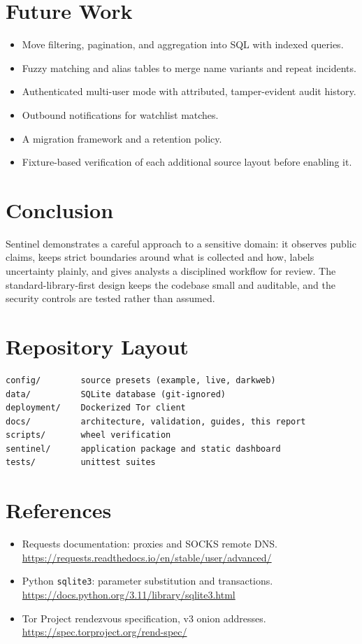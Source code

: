 \documentclass[11pt,a4paper]{article}
\newcommand{\code}[1]{\texttt{\small #1}}
\begin{document}
\section{Future Work}
\begin{itemize}
  \item Move filtering, pagination, and aggregation into SQL with indexed queries.
  \item Fuzzy matching and alias tables to merge name variants and repeat incidents.
  \item Authenticated multi-user mode with attributed, tamper-evident audit history.
  \item Outbound notifications for watchlist matches.
  \item A migration framework and a retention policy.
  \item Fixture-based verification of each additional source layout before enabling it.
\end{itemize}

\section{Conclusion}
Sentinel demonstrates a careful approach to a sensitive domain: it observes public claims, keeps strict boundaries around what is collected and how, labels uncertainty plainly, and gives analysts a disciplined workflow for review. The standard-library-first design keeps the codebase small and auditable, and the security controls are tested rather than assumed.

\appendix
\section{Repository Layout}
\begin{lstlisting}
config/        source presets (example, live, darkweb)
data/          SQLite database (git-ignored)
deployment/    Dockerized Tor client
docs/          architecture, validation, guides, this report
scripts/       wheel verification
sentinel/      application package and static dashboard
tests/         unittest suites
\end{lstlisting}

\section{References}
\begin{itemize}
  \item Requests documentation: proxies and SOCKS remote DNS. \url{https://requests.readthedocs.io/en/stable/user/advanced/}
  \item Python \code{sqlite3}: parameter substitution and transactions. \url{https://docs.python.org/3.11/library/sqlite3.html}
  \item Tor Project rendezvous specification, v3 onion addresses. \url{https://spec.torproject.org/rend-spec/}
\end{itemize}
\end{document}
